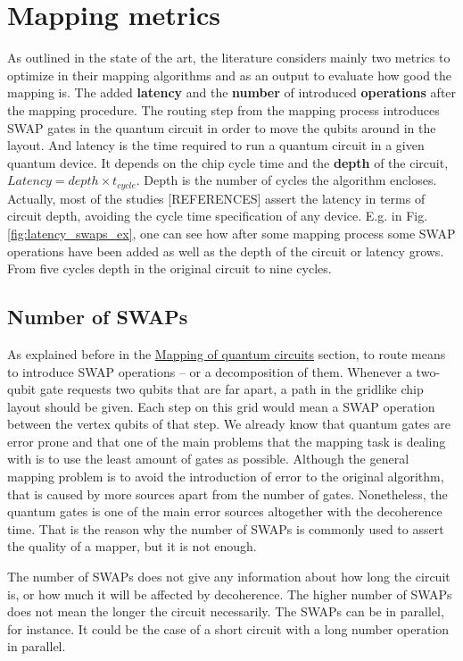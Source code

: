 \section{Mapping metrics}
\label{sec:org57b68b3}
As outlined in the state of the art, the literature considers mainly two metrics to optimize in their mapping algorithms and as an output to evaluate how good the mapping is.
The added \textbf{latency} and the \textbf{number} of introduced \textbf{operations} after the mapping procedure.
The routing step from the mapping process introduces SWAP gates in the quantum circuit in order to move the qubits around in the layout.
And latency is the time required to run a quantum circuit in a given quantum device.
It depends on the chip cycle time and the \textbf{depth} of the circuit, \(Latency = depth \times t_{cycle}\).
Depth is the number of cycles the algorithm encloses.
Actually, most of the studies [REFERENCES] assert the latency in terms of circuit depth, avoiding the cycle time specification of any device.
E.g. in Fig. \ref{fig:latency_swaps_ex}, one can see how after some mapping process some SWAP operations have been added as well as the depth of the circuit or latency grows.
From five cycles depth in the original circuit to nine cycles.

\subsection{Number of SWAPs}
\label{sec:org27dec8f}

As explained before in the \hyperref[sec:org1e1811a]{Mapping of quantum circuits} section, to route means to introduce SWAP operations -- or a decomposition of them.
Whenever a two-qubit gate requests two qubits that are far apart, a path in the gridlike chip layout should be given.
Each step on this grid would mean a SWAP operation between the vertex qubits of that step.
We already know that quantum gates are error prone and that one of the main problems that the mapping task is dealing with is to use the least amount of gates as possible.
Although the general mapping problem is to avoid the introduction of error to the original algorithm, that is caused by more sources apart from the number of gates.
Nonetheless, the quantum gates is one of the main error sources altogether with the decoherence time.
That is the reason why the number of SWAPs is commonly used to assert the quality of a mapper, but it is not enough.

The number of SWAPs does not give any information about how long the circuit is, or how much it will be affected by decoherence.
The higher number of SWAPs does not mean the longer the circuit necessarily.
The SWAPs can be in parallel, for instance.
It could be the case of a short circuit with a long number operation in parallel.

